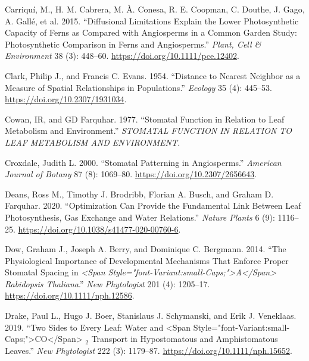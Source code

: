 \documentclass[12pt,halfline,a4paper,]{ouparticle}
\newlength{\cslhangindent}
\newlength{\cslentryspacingunit} %
\newenvironment{CSLReferences}[2] %
 {%
  \setlength{\parindent}{0pt}
  \ifodd #1
  \let\oldpar\par
  \def\par{\hangindent=\cslhangindent\oldpar}
  \fi
  \setlength{\parskip}{#2\cslentryspacingunit}
 }%
 {}
\begin{document}
\begin{CSLReferences}{1}{0}
\leavevmode{}%
Carriquí, M., H. M. Cabrera, M. À. Conesa, R. E. Coopman, C. Douthe, J.
Gago, A. Gallé, et al. 2015. {``Diffusional Limitations Explain the
Lower Photosynthetic Capacity of Ferns as Compared with Angiosperms in a
Common Garden Study: {Photosynthetic} Comparison in Ferns and
Angiosperms.''} \emph{Plant, Cell \& Environment} 38 (3): 448--60.
\url{https://doi.org/10.1111/pce.12402}.

\leavevmode{}%
Clark, Philip J., and Francis C. Evans. 1954. {``Distance to Nearest
Neighbor as a Measure of Spatial Relationships in Populations.''}
\emph{Ecology} 35 (4): 445--53. \url{https://doi.org/10.2307/1931034}.

\leavevmode{}%
Cowan, IR, and GD Farquhar. 1977. {``Stomatal Function in Relation to
Leaf Metabolism and Environment.''} \emph{STOMATAL FUNCTION IN RELATION
TO LEAF METABOLISM AND ENVIRONMENT.}

\leavevmode{}%
Croxdale, Judith L. 2000. {``Stomatal Patterning in Angiosperms.''}
\emph{American Journal of Botany} 87 (8): 1069--80.
\url{https://doi.org/10.2307/2656643}.

\leavevmode{}%
Deans, Ross M., Timothy J. Brodribb, Florian A. Busch, and Graham D.
Farquhar. 2020. {``Optimization Can Provide the Fundamental Link Between
Leaf Photosynthesis, Gas Exchange and Water Relations.''} \emph{Nature
Plants} 6 (9): 1116--25.
\url{https://doi.org/10.1038/s41477-020-00760-6}.

\leavevmode{}%
Dow, Graham J., Joseph A. Berry, and Dominique C. Bergmann. 2014. {``The
Physiological Importance of Developmental Mechanisms That Enforce Proper
Stomatal Spacing in \emph{{\textless{}}Span
Style="font-Variant:small-Caps;"{\textgreater{}}{A}{\textless{}}/Span{\textgreater{}}
Rabidopsis Thaliana}.''} \emph{New Phytologist} 201 (4): 1205--17.
\url{https://doi.org/10.1111/nph.12586}.

\leavevmode{}%
Drake, Paul L., Hugo J. Boer, Stanislaus J. Schymanski, and Erik J.
Veneklaas. 2019. {``Two Sides to Every Leaf: Water and {\textless{}}Span
Style="font-Variant:small-Caps;"{\textgreater{}}{CO}{\textless{}}/Span{\textgreater{}}
\(_{\textrm{2}}\) Transport in Hypostomatous and Amphistomatous
Leaves.''} \emph{New Phytologist} 222 (3): 1179--87.
\url{https://doi.org/10.1111/nph.15652}.


\end{CSLReferences}
\end{document}
